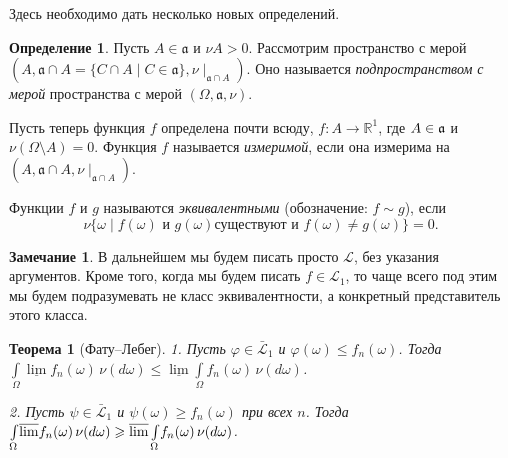 \documentclass[12pt,titlepage]{article}
\newcounter{tema}
\newtheorem{theorem}{Теорема}[tema]
\theoremstyle{definition}
\newtheorem{defen}{Определение}[tema]
\newtheorem*{zam}{Замечание}
\newcommand*{\p}[1]{#1\nobreak\discretionary{}{\hbox{$\mathsurround=0pt #1$}}{}}
\begin{document}
Здесь необходимо дать несколько новых определений.

\begin{defen}
Пусть $A\in\mathfrak{a}$ и $\nu A>0$. Рассмотрим пространство с
мерой $(A,\mathfrak{a}\cap A=\{C\cap A\mid
C\in\mathfrak{a}\},\nu\mid_{\mathfrak{a}\cap A})$. Оно называется
\emph{подпространством с мерой} пространства с мерой $(\Omega,
\mathfrak{a}, \nu)$.

Пусть теперь функция $f$ определена почти всюду, $f\colon A\to
\mathbb{R}^1$, где $A\p\in\mathfrak{a}$ и $\nu(\Omega\setminus
A)=0$. Функция $f$ называется \emph{измеримой}, если она измерима на
$(A, \mathfrak{a}\cap A, \nu\mid_{\mathfrak{a}\cap A})$.

Функции $f$ и $g$ называются \emph{эквивалентными} (обозначение:
$f\sim g$), если $$\nu\{\omega\mid \text{$f(\omega)$ и $g(\omega)$
существуют и $f(\omega)\neq g(\omega)$}\}=0.$$
\end{defen}

\begin{zam}
В дальнейшем мы будем писать просто $\mathcal{L}$, без указания
аргументов. Кроме того, когда мы будем писать $f\in\mathcal{L}_1$,
то чаще всего под этим мы будем подразумевать не класс
эквивалентности, а конкретный представитель этого класса.
\end{zam}

\begin{theorem}[Фату--Лебег]
1. Пусть $\varphi\in\mathcal{\bar{L}}_1$ и $\varphi(\omega)\leqslant
f_n(\omega)$. Тогда
$\int\limits_\Omega\!\underline{\lim}f_n(\omega)\,\nu(d\omega)
\leqslant\underline{\lim} \int\limits_\Omega\!
f_n(\omega)\,\nu(d\omega)$.

2. Пусть $\psi\in\mathcal{\bar{L}}_1$ и $\psi(\omega)\geqslant
f_n(\omega)$ при всех $n$. Тогда
$\int\limits_\Omega\!\overline{\lim}f_n(\omega)\,\nu(d\omega)
\p\geqslant\overline{\lim} \int\limits_\Omega\!
f_n(\omega)\,\nu(d\omega)$.
\end{theorem}
\end{document}
